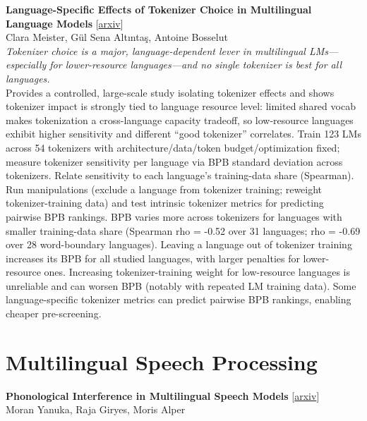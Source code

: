 \documentclass[12pt,letterpaper]{article}
\begin{document}
\medskip

{\small\textbf{Language-Specific Effects of Tokenizer Choice in Multilingual Language Models}} {\scriptsize[\href{https://arxiv.org/abs/2610.12144}{arxiv}]}\\
{\scriptsize Clara Meister, Gül Sena Altıntaş, Antoine Bosselut}\\

{\small\textit{Tokenizer choice is a major, language-dependent lever in multilingual LMs---especially for lower-resource languages---and no single tokenizer is best for all languages.}}\\[1pt]
{\footnotesize Provides a controlled, large-scale study isolating tokenizer effects and shows tokenizer impact is strongly tied to language resource level: limited shared vocab makes tokenization a cross-language capacity tradeoff, so low-resource languages exhibit higher sensitivity and different ``good tokenizer'' correlates. Train 123 LMs across 54 tokenizers with architecture/data/token budget/optimization fixed; measure tokenizer sensitivity per language via BPB standard deviation across tokenizers. Relate sensitivity to each language's training-data share (Spearman). Run manipulations (exclude a language from tokenizer training; reweight tokenizer-training data) and test intrinsic tokenizer metrics for predicting pairwise BPB rankings. BPB varies more across tokenizers for languages with smaller training-data share (Spearman rho = -0.52 over 31 languages; rho = -0.69 over 28 word-boundary languages). Leaving a language out of tokenizer training increases its BPB for all studied languages, with larger penalties for lower-resource ones. Increasing tokenizer-training weight for low-resource languages is unreliable and can worsen BPB (notably with repeated LM training data). Some language-specific tokenizer metrics can predict pairwise BPB rankings, enabling cheaper pre-screening.}

\medskip


\section*{Multilingual Speech Processing}

{\small\textbf{Phonological Interference in Multilingual Speech Models}} {\scriptsize[\href{https://arxiv.org/abs/2610.11275}{arxiv}]}\\
{\scriptsize Moran Yanuka, Raja Giryes, Moris Alper}\\
\end{document}
